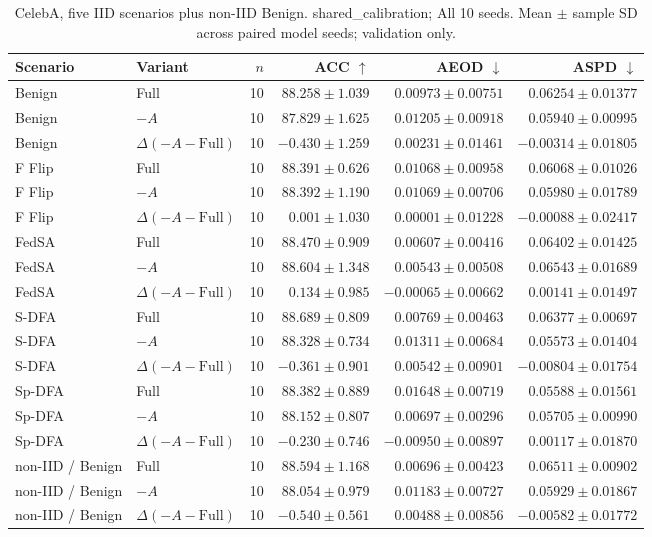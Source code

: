 \begin{table}[t]
\centering
\small
\caption{CelebA, five IID scenarios plus non-IID Benign. shared\_calibration; All 10 seeds. Mean $\pm$ sample SD across paired model seeds; validation only.}
\begin{tabular}{llrrrr}
\toprule
Scenario & Variant & $n$ & ACC $\uparrow$ & AEOD $\downarrow$ & ASPD $\downarrow$ \\
\midrule
Benign & Full & 10 & $88.258 \pm 1.039$ & $0.00973 \pm 0.00751$ & $0.06254 \pm 0.01377$ \\
Benign & $-A$ & 10 & $87.829 \pm 1.625$ & $0.01205 \pm 0.00918$ & $0.05940 \pm 0.00995$ \\
Benign & $\Delta(-A-\mathrm{Full})$ & 10 & $-0.430 \pm 1.259$ & $0.00231 \pm 0.01461$ & $-0.00314 \pm 0.01805$ \\
F Flip & Full & 10 & $88.391 \pm 0.626$ & $0.01068 \pm 0.00958$ & $0.06068 \pm 0.01026$ \\
F Flip & $-A$ & 10 & $88.392 \pm 1.190$ & $0.01069 \pm 0.00706$ & $0.05980 \pm 0.01789$ \\
F Flip & $\Delta(-A-\mathrm{Full})$ & 10 & $0.001 \pm 1.030$ & $0.00001 \pm 0.01228$ & $-0.00088 \pm 0.02417$ \\
FedSA & Full & 10 & $88.470 \pm 0.909$ & $0.00607 \pm 0.00416$ & $0.06402 \pm 0.01425$ \\
FedSA & $-A$ & 10 & $88.604 \pm 1.348$ & $0.00543 \pm 0.00508$ & $0.06543 \pm 0.01689$ \\
FedSA & $\Delta(-A-\mathrm{Full})$ & 10 & $0.134 \pm 0.985$ & $-0.00065 \pm 0.00662$ & $0.00141 \pm 0.01497$ \\
S-DFA & Full & 10 & $88.689 \pm 0.809$ & $0.00769 \pm 0.00463$ & $0.06377 \pm 0.00697$ \\
S-DFA & $-A$ & 10 & $88.328 \pm 0.734$ & $0.01311 \pm 0.00684$ & $0.05573 \pm 0.01404$ \\
S-DFA & $\Delta(-A-\mathrm{Full})$ & 10 & $-0.361 \pm 0.901$ & $0.00542 \pm 0.00901$ & $-0.00804 \pm 0.01754$ \\
Sp-DFA & Full & 10 & $88.382 \pm 0.889$ & $0.01648 \pm 0.00719$ & $0.05588 \pm 0.01561$ \\
Sp-DFA & $-A$ & 10 & $88.152 \pm 0.807$ & $0.00697 \pm 0.00296$ & $0.05705 \pm 0.00990$ \\
Sp-DFA & $\Delta(-A-\mathrm{Full})$ & 10 & $-0.230 \pm 0.746$ & $-0.00950 \pm 0.00897$ & $0.00117 \pm 0.01870$ \\
non-IID / Benign & Full & 10 & $88.594 \pm 1.168$ & $0.00696 \pm 0.00423$ & $0.06511 \pm 0.00902$ \\
non-IID / Benign & $-A$ & 10 & $88.054 \pm 0.979$ & $0.01183 \pm 0.00727$ & $0.05929 \pm 0.01867$ \\
non-IID / Benign & $\Delta(-A-\mathrm{Full})$ & 10 & $-0.540 \pm 0.561$ & $0.00488 \pm 0.00856$ & $-0.00582 \pm 0.01772$ \\
\bottomrule
\end{tabular}
\end{table}

